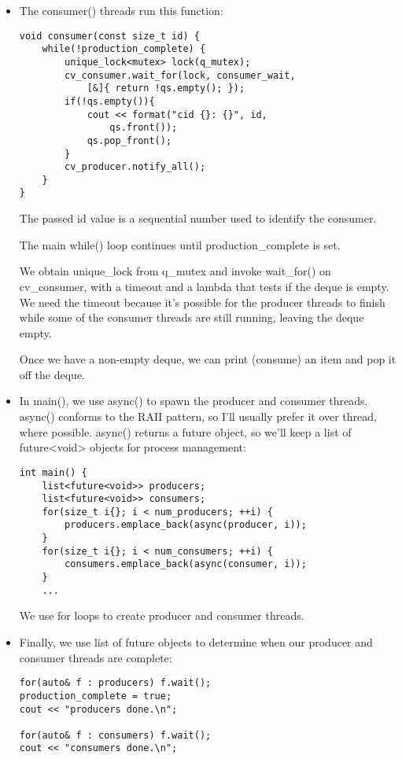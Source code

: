 \begin{itemize}
\item 
The consumer() threads run this function:

\begin{lstlisting}[style=styleCXX]
void consumer(const size_t id) {
	while(!production_complete) {
		unique_lock<mutex> lock(q_mutex);
		cv_consumer.wait_for(lock, consumer_wait,
			[&]{ return !qs.empty(); });
		if(!qs.empty()){
			cout << format("cid {}: {}", id,
				qs.front());
			qs.pop_front();
		}
		cv_producer.notify_all();
	}
}
\end{lstlisting}

The passed id value is a sequential number used to identify the consumer.

The main while() loop continues until production\_complete is set.

We obtain unique\_lock from q\_mutex and invoke wait\_for() on cv\_consumer, with a timeout and a lambda that tests if the deque is empty. We need the timeout because it's possible for the producer threads to finish while some of the consumer threads are still running, leaving the deque empty.

Once we have a non-empty deque, we can print (consume) an item and pop it off the deque.

\item 
In main(), we use async() to spawn the producer and consumer threads. async() conforms to the RAII pattern, so I'll usually prefer it over thread, where possible. async() returns a future object, so we'll keep a list of future<void> objects for process management:

\begin{lstlisting}[style=styleCXX]
int main() {
	list<future<void>> producers;
	list<future<void>> consumers;
	for(size_t i{}; i < num_producers; ++i) {
		producers.emplace_back(async(producer, i));
	}
	for(size_t i{}; i < num_consumers; ++i) {
		consumers.emplace_back(async(consumer, i));
	}
	...
\end{lstlisting}

We use for loops to create producer and consumer threads.

\item 
Finally, we use list of future objects to determine when our producer and consumer threads are complete:

\begin{lstlisting}[style=styleCXX]
for(auto& f : producers) f.wait();
production_complete = true;
cout << "producers done.\n";

for(auto& f : consumers) f.wait();
cout << "consumers done.\n";
\end{lstlisting}


\end{itemize}
